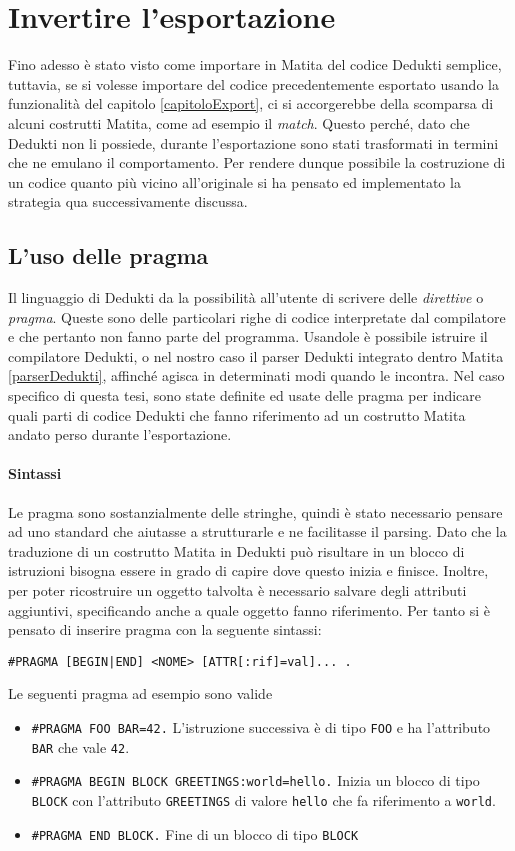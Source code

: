 \documentclass[12pt,a4paper]{report}
\begin{document}
\section{Invertire l'esportazione}
Fino adesso è stato visto come importare in Matita del codice Dedukti semplice,
tuttavia, se si volesse importare del codice precedentemente esportato usando
la funzionalità del capitolo \ref{capitoloExport}, ci si accorgerebbe della 
scomparsa di alcuni costrutti Matita, come ad esempio il \textit{match}. Questo
perché, dato che Dedukti non li possiede, durante l'esportazione sono stati
trasformati in termini che ne emulano il comportamento. Per rendere dunque possibile
la costruzione di un codice quanto più vicino all'originale si ha pensato ed 
implementato la strategia qua successivamente discussa.

\subsection{L'uso delle pragma}
Il linguaggio di Dedukti da la possibilità all'utente di scrivere delle 
\textit{direttive} o \textit{pragma}. Queste sono delle particolari righe di
codice interpretate dal compilatore e che pertanto non fanno parte del programma.
Usandole è possibile istruire il compilatore Dedukti, o nel nostro caso il parser
Dedukti integrato dentro Matita \ref{parserDedukti}, affinché agisca in determinati
modi quando le incontra. 
Nel caso specifico di questa tesi, sono state definite ed usate delle pragma
per indicare quali parti di codice Dedukti che fanno riferimento ad un costrutto 
Matita andato perso durante l'esportazione.

\paragraph{Sintassi} Le pragma sono sostanzialmente delle stringhe, quindi
è stato necessario pensare ad uno standard che aiutasse a strutturarle e 
ne facilitasse il parsing. Dato che la traduzione di un costrutto Matita in 
Dedukti può risultare in un blocco di istruzioni bisogna essere in grado di
capire dove questo inizia e finisce. Inoltre, per poter ricostruire un oggetto
talvolta è necessario salvare degli attributi aggiuntivi, specificando anche
a quale oggetto fanno riferimento. Per tanto si è pensato di inserire pragma
con la seguente sintassi:

\begin{center}
  \texttt{\#PRAGMA [BEGIN|END] <NOME> [ATTR[:rif]=val]... .}
\end{center}
Le seguenti pragma ad esempio sono valide
\begin{itemize}
  \item  \texttt{\#PRAGMA FOO BAR=42.} L'istruzione successiva è di tipo
\texttt{FOO} e ha l'attributo \texttt{BAR} che vale \texttt{42}.
  \item  \texttt{\#PRAGMA BEGIN BLOCK GREETINGS:world=hello.} Inizia un blocco di
    tipo \texttt{BLOCK} con l'attributo \texttt{GREETINGS} di valore \texttt{hello}
    che fa riferimento a \texttt{world}.
  \item  \texttt{\#PRAGMA END BLOCK.} Fine di un blocco di tipo \texttt{BLOCK}
\end{itemize}
\end{document}
